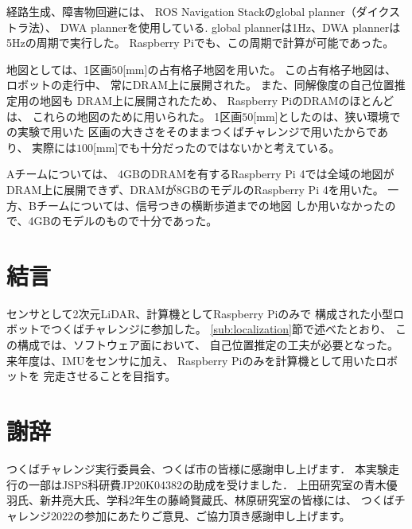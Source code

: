 \documentclass[twocolumn,9pt]{jsproceedings}
\begin{document}
経路生成、障害物回避には、
ROS Navigation Stackのglobal planner（ダイクストラ法）、
DWA plannerを使用している. 
global plannerは1Hz、DWA plannerは5Hzの周期で実行した。
Raspberry Piでも、この周期で計算が可能であった。

地図としては、1区画$50$[mm]の占有格子地図を用いた。
この占有格子地図は、ロボットの走行中、
常にDRAM上に展開された。
また、同解像度の自己位置推定用の地図も
DRAM上に展開されたため、
Raspberry PiのDRAMのほとんどは、
これらの地図のために用いられた。
1区画$50$[mm]としたのは、狭い環境での実験で用いた
区画の大きさをそのままつくばチャレンジで用いたからであり、
実際には$100$[mm]でも十分だったのではないかと考えている。

Aチームについては、
4GBのDRAMを有するRaspberry Pi 4では全域の地図が
DRAM上に展開できず、DRAMが8GBのモデルのRaspberry Pi 4を用いた。
一方、Bチームについては、信号つきの横断歩道までの地図
しか用いなかったので、4GBのモデルのもので十分であった。


\section{結言}

センサとして2次元LiDAR、計算機としてRaspberry Piのみで
構成された小型ロボットでつくばチャレンジに参加した。
\ref{sub:localization}節で述べたとおり、
この構成では、ソフトウェア面において、
自己位置推定の工夫が必要となった。
来年度は、IMUをセンサに加え、
Raspberry Piのみを計算機として用いたロボットを
完走させることを目指す。

\section*{謝辞}

つくばチャレンジ実行委員会、つくば市の皆様に感謝申し上げます．
本実験走行の一部はJSPS科研費JP20K04382の助成を受けました．
上田研究室の青木優羽氏、新井亮大氏、学科2年生の藤崎賢蔵氏、林原研究室の皆様には、
つくばチャレンジ2022の参加にあたりご意見、ご協力頂き感謝申し上げます。

\end{document}
